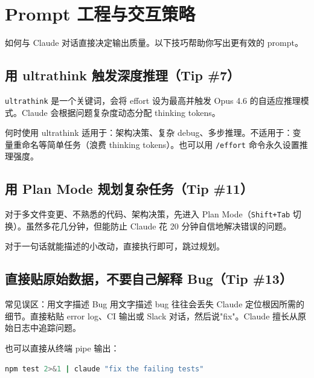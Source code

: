 \section{Prompt 工程与交互策略}

如何与 Claude 对话直接决定输出质量。以下技巧帮助你写出更有效的 prompt。

\subsection{用 ultrathink 触发深度推理（Tip \#7）}

\texttt{ultrathink} 是一个关键词，会将 effort 设为最高并触发 Opus 4.6 的自适应推理模式。Claude 会根据问题复杂度动态分配 thinking tokens。

\begin{importantbox}{何时使用 ultrathink}
适用于：架构决策、复杂 debug、多步推理。不适用于：变量重命名等简单任务（浪费 thinking tokens）。也可以用 \texttt{/effort} 命令永久设置推理强度。
\end{importantbox}

\subsection{用 Plan Mode 规划复杂任务（Tip \#11）}

对于多文件变更、不熟悉的代码、架构决策，先进入 Plan Mode（\texttt{Shift+Tab} 切换）。虽然多花几分钟，但能防止 Claude 花 20 分钟自信地解决错误的问题。

对于一句话就能描述的小改动，直接执行即可，跳过规划。

\subsection{直接贴原始数据，不要自己解释 Bug（Tip \#13）}

\begin{warningbox}{常见误区：用文字描述 Bug}
用文字描述 bug 往往会丢失 Claude 定位根因所需的细节。直接粘贴 error log、CI 输出或 Slack 对话，然后说"fix"。Claude 擅长从原始日志中追踪问题。
\end{warningbox}

也可以直接从终端 pipe 输出：

\begin{lstlisting}[caption={管道传输错误信息}, language=bash]
npm test 2>&1 | claude "fix the failing tests"
\end{lstlisting}

